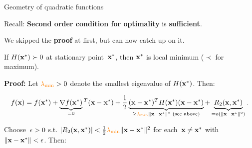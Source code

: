 \documentclass[11pt,compress,t,notes=noshow, xcolor=table]{beamer}
\begin{document}
\begin{vbframe}{Geometry of quadratic functions}
\begin{itemize}



\end{itemize}

Recall: \textbf{Second order condition for optimality} is \textbf{sufficient}.

\medskip

We skipped the \textbf{proof} at first, but can now catch up on it.


    \footnotesize
     If $H(\mathbf{x}^\ast) \succ 0$ at stationary point~$\mathbf{x}^\ast$, then $\mathbf{x}^\ast$ is local minimum ($\prec$ for maximum).

     \medskip

    \textbf{Proof:}
    Let $\textcolor{orange}{\lambda_\text{min}}>0$ denote the smallest eigenvalue of $H(\mathbf{x}^\ast)$.
    Then:
    
    \vspace{-1.25\baselineskip}
    
    \begin{equation*}
        f(\mathbf{x}) = f(\mathbf{x}^\ast) + \underbrace{\nabla f(\mathbf{x}^\ast)}_{=0}{}^T(\mathbf{x}-\mathbf{x}^\ast) + \frac{1}{2}\underbrace{(\mathbf{x}-\mathbf{x}^\ast)^T H(\mathbf{x}^\ast)(\mathbf{x}-\mathbf{x}^\ast)}_{\geq \textcolor{orange}{\lambda_\text{min}} \|\mathbf{x}-\mathbf{x}^\ast\|^2 \text{ (see above)}} + \underbrace{R_2(\mathbf{x},\mathbf{x}^\ast)}_{=o(\|\mathbf{x}-\mathbf{x}^\ast\|^2)}.
    \end{equation*}

    Choose~$\epsilon>0$ s.t. $|R_2(\mathbf{x},\mathbf{x}^\ast)| < \frac{1}{2} \textcolor{orange}{\lambda_\text{min}} \|\mathbf{x}-\mathbf{x}^\ast\|^2$ for each~$\mathbf{x} \neq \mathbf{x}^\ast$ with $\|\mathbf{x}-\mathbf{x}^\ast\|<\epsilon$.
    Then:


\end{vbframe}
\end{document}
